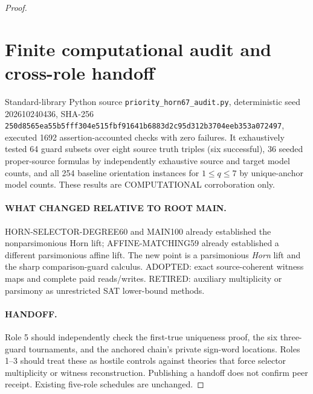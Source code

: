 \documentclass[11pt]{article}
\begin{document}
\begin{proof}
\section{Finite computational audit and cross-role handoff}
Standard-library Python source \texttt{priority\_horn67\_audit.py}, deterministic seed 202610240436, SHA-256 \texttt{250d8565ea55b5fff304e515fbf91641b6883d2c95d312b3704eeb353a072497}, executed 1692 assertion-accounted checks with zero failures. It exhaustively tested 64 guard subsets over eight source truth triples (six successful), 36 seeded proper-source formulas by independently exhaustive source and target model counts, and all 254 baseline orientation instances for $1\le q\le7$ by unique-anchor model counts. These results are COMPUTATIONAL corroboration only.
\paragraph{WHAT CHANGED RELATIVE TO ROOT MAIN.} HORN-SELECTOR-DEGREE60 and MAIN100 already established the nonparsimonious Horn lift; AFFINE-MATCHING59 already established a different parsimonious affine lift. The new point is a parsimonious \emph{Horn} lift and the sharp comparison-guard calculus. ADOPTED: exact source-coherent witness maps and complete paid reads/writes. RETIRED: auxiliary multiplicity or parsimony as unrestricted SAT lower-bound methods.
\paragraph{HANDOFF.} Role 5 should independently check the first-true uniqueness proof, the six three-guard tournaments, and the anchored chain's private sign-word locations. Roles 1--3 should treat these as hostile controls against theories that force selector multiplicity or witness reconstruction. Publishing a handoff does not confirm peer receipt. Existing five-role schedules are unchanged.

\end{proof}
\end{document}
